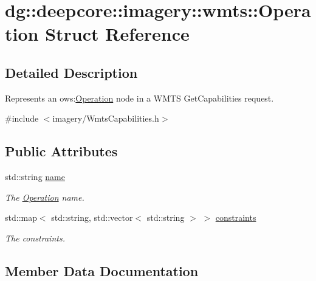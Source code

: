 \hypertarget{structdg_1_1deepcore_1_1imagery_1_1wmts_1_1_operation}{}\section{dg\+:\+:deepcore\+:\+:imagery\+:\+:wmts\+:\+:Operation Struct Reference}
\label{structdg_1_1deepcore_1_1imagery_1_1wmts_1_1_operation}


\subsection{Detailed Description}
Represents an ows\+:\hyperlink{structdg_1_1deepcore_1_1imagery_1_1wmts_1_1_operation}{Operation} node in a W\+M\+TS Get\+Capabilities request. 

{\ttfamily \#include $<$imagery/\+Wmts\+Capabilities.\+h$>$}

\subsection*{Public Attributes}
\begin{DoxyCompactItemize}
\item 
std\+::string \hyperlink{structdg_1_1deepcore_1_1imagery_1_1wmts_1_1_operation_a8263a9299fabb3467f2a38baeba1b9b0}{name}
\begin{DoxyCompactList}\small\item\em The \hyperlink{structdg_1_1deepcore_1_1imagery_1_1wmts_1_1_operation}{Operation} name. \end{DoxyCompactList}\item 
std\+::map$<$ std\+::string, std\+::vector$<$ std\+::string $>$ $>$ \hyperlink{structdg_1_1deepcore_1_1imagery_1_1wmts_1_1_operation_ab607d8f694296244e6a16f98ff4098f5}{constraints}
\begin{DoxyCompactList}\small\item\em The constraints. \end{DoxyCompactList}\end{DoxyCompactItemize}


\subsection{Member Data Documentation}
